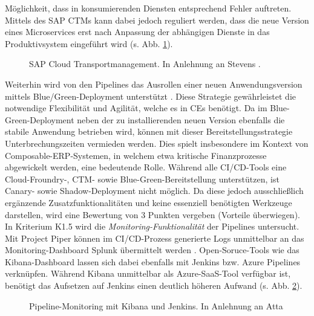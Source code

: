 Möglichkeit, dass in konsumierenden Diensten entsprechend Fehler auftreten. Mittels des SAP CTMs kann dabei jedoch reguliert werden, dass die neue Version eines Microservices erst nach Anpassung der abhängigen Dienste in das Produktivsystem eingeführt wird (s. Abb. \ref*{fig:CTM}).
\begin{center}
	\begin{figure}[H]
		\centering
		\caption[SAP Cloud Transportmanagement]{SAP Cloud Transportmanagement. In Anlehnung an Stevens \cite{.20230327}.}
		\label{fig:CTM}
	\end{figure}
\end{center}
\vspace*{-10mm}
Weiterhin wird von den Pipelines das Ausrollen einer neuen Anwendungsversion mittels Blue/Green-Deployment unterstützt \cite{.20230406c}. Diese Strategie gewährleistet die notwendige Flexibilität und Agilität, welche es in CEs benötigt. Da im Blue-Green-Deployment neben der zu installierenden neuen Version ebenfalls die stabile Anwendung betrieben wird, können mit dieser Bereitstellungsstrategie Unterbrechungszeiten vermieden werden. Dies spielt insbesondere im Kontext von Composable-ERP-Systemen, in welchem etwa kritische Finanzprozesse abgewickelt werden, eine bedeutende Rolle. Während alle CI/CD-Tools eine Cloud-Froundry-, CTM- sowie Blue-Green-Bereitstellung unterstützen, ist Canary- sowie Shadow-Deployment nicht möglich. Da diese jedoch ausschließlich ergänzende Zusatzfunktionalitäten und keine essenziell benötigten Werkzeuge darstellen, wird eine Bewertung von 3 Punkten vergeben (Vorteile überwiegen). In Kriterium K1.5 wird die \textit{Monitoring-Funktionalität} der Pipelines untersucht. Mit Project Piper können im CI/CD-Prozess generierte Logs unmittelbar an das Monitoring-Dashboard Splunk übermittelt werden \cite[Z. 72 ff.]{ProductManagerSAPHyperspaceCICD.}. Open-Soruce-Tools wie das Kibana-Dashboard lassen sich dabei ebenfalls mit Jenkins bzw. Azure Pipelines verknüpfen. Während Kibana unmittelbar als Azure-SaaS-Tool verfügbar ist, benötigt das Aufsetzen auf Jenkins einen deutlich höheren Aufwand (s. Abb. \ref{fig:kibana}). 
\begin{center}
	\begin{figure}[H]
		\centering
		\caption[Pipeline-Monitoring mit Kibana und Jenkins]{Pipeline-Monitoring mit Kibana und Jenkins. In Anlehnung an Atta \cite{Atta.20201012}}
		\label{fig:kibana}
	\end{figure}
\end{center}
